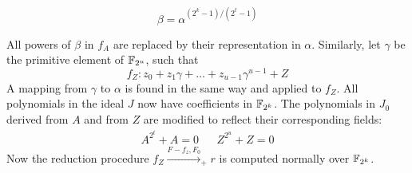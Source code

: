 \begin{equation}
\beta=\alpha^{(2^k-1)/(2^t-1)} \label{eqn:betaToAlpha}
\end{equation}

All powers of $\beta$ in $f_A$ are replaced by their representation in $\alpha$.
Similarly, let $\gamma$ be the primitive element of ${\mathbb{F}}_{2^u}$, such that
\begin{equation}
f_Z: z_0+z_1\gamma+\dots+z_{u-1}\gamma^{u-1}+Z
\end{equation}
A mapping from $\gamma$ to $\alpha$ is found in the same way and applied to $f_Z$.
All polynomials in the ideal $J$ now have coefficients in ${\mathbb{F}}_{2^k}$. The polynomials in 
$J_0$ derived from $A$ and from $Z$ are modified to reflect their corresponding fields:
\begin{eqnarray}
A^{2^t}+A=0 & & Z^{2^u}+Z=0
\end{eqnarray}
Now the reduction procedure $f_Z\xrightarrow{F-{f_z},F_0}_+ r$ is 
computed normally over ${\mathbb{F}}_{2^k}$. 


